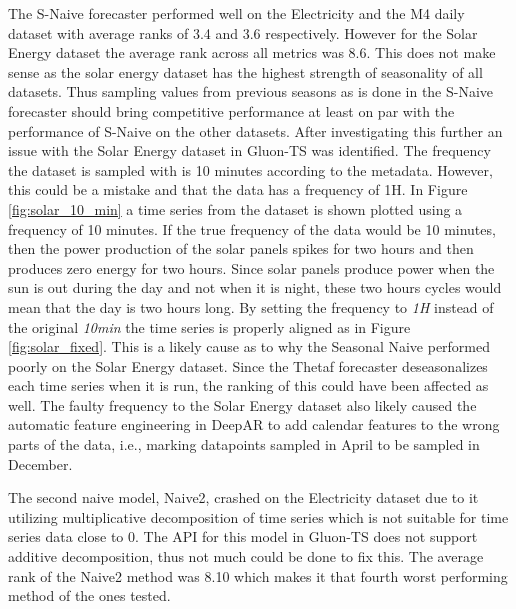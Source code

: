 The S-Naive forecaster performed well on the Electricity and the M4 daily dataset with average ranks of 3.4 and 3.6 respectively. However for the Solar Energy dataset the average rank across all metrics was 8.6. This does not make sense as the solar energy dataset has the highest strength of seasonality of all datasets. Thus sampling values from previous seasons as is done in the S-Naive forecaster should bring competitive performance at least on par with the performance of S-Naive on the other datasets. After investigating this further an issue with the Solar Energy dataset in Gluon-TS was identified. The frequency the dataset is sampled with is 10 minutes according to the metadata. However, this could be a mistake and that the data has a frequency of 1H. In Figure \ref{fig:solar_10_min} a time series from the dataset is shown plotted using a frequency of 10 minutes. If the true frequency of the data would be 10 minutes, then the power production of the solar panels spikes for two hours and then produces zero energy for two hours. Since solar panels produce power when the sun is out during the day and not when it is night, these two hours cycles would mean that the day is two hours long. By setting the frequency to \textit{1H} instead of the original \textit{10min} the time series is properly aligned as in Figure \ref{fig:solar_fixed}. This is a likely cause as to why the Seasonal Naive performed poorly on the Solar Energy dataset. Since the Thetaf forecaster deseasonalizes each time series when it is run, the ranking of this could have been affected as well. The faulty frequency to the Solar Energy dataset also likely caused the automatic feature engineering in DeepAR to add calendar features to the wrong parts of the data, i.e., marking datapoints sampled in April to be sampled in December.

The second naive model, Naive2, crashed on the Electricity dataset due to it utilizing multiplicative decomposition of time series which is not suitable for time series data close to 0. The API for this model in Gluon-TS does not support additive decomposition, thus not much could be done to fix this. The average rank of the Naive2 method was 8.10 which makes it that fourth worst performing method of the ones tested.

